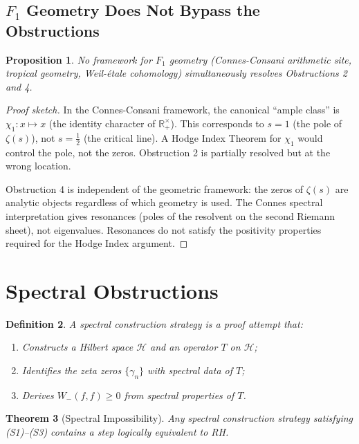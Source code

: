 \documentclass[12pt]{article}
\newtheorem{theorem}{Theorem}[section]
\newtheorem{proposition}[theorem]{Proposition}
\newtheorem{definition}[theorem]{Definition}
\newcommand{\RR}{\mathbb{R}}
\newcommand{\HH}{\mathcal{H}}
\begin{document}
\subsection{$F_1$ Geometry Does Not Bypass the Obstructions}

\begin{proposition}
\label{prop:f1}
No framework for $F_1$ geometry (Connes-Consani arithmetic site, tropical
geometry, Weil-\'etale cohomology) simultaneously resolves Obstructions 2
and 4.
\end{proposition}

\begin{proof}[Proof sketch]
In the Connes-Consani framework, the canonical ``ample class'' is
$\chi_1: x \mapsto x$ (the identity character of $\RR^\times_+$). This
corresponds to $s = 1$ (the pole of $\zeta(s)$), not $s = \frac{1}{2}$
(the critical line). A Hodge Index Theorem for $\chi_1$ would control the
pole, not the zeros. Obstruction 2 is partially resolved but at the wrong
location.

Obstruction 4 is independent of the geometric framework: the zeros of
$\zeta(s)$ are analytic objects regardless of which geometry is used.
The Connes spectral interpretation gives resonances (poles of the resolvent
on the second Riemann sheet), not eigenvalues. Resonances do not satisfy
the positivity properties required for the Hodge Index argument.
\end{proof}

\section{Spectral Obstructions}

\begin{definition}
A \emph{spectral construction strategy} is a proof attempt that:
\begin{enumerate}
\item[(S1)] Constructs a Hilbert space $\HH$ and an operator $T$ on $\HH$;
\item[(S2)] Identifies the zeta zeros $\{\gamma_n\}$ with spectral data of $T$;
\item[(S3)] Derives $W_-(f,f) \geq 0$ from spectral properties of $T$.
\end{enumerate}
\end{definition}

\begin{theorem}[Spectral Impossibility]
\label{thm:spectral}
Any spectral construction strategy satisfying (S1)--(S3) contains a step
logically equivalent to RH.
\end{theorem}
\end{document}
